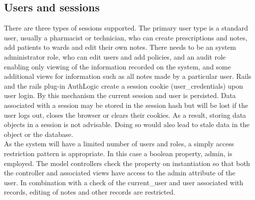 \documentclass[letterpaper]{amsart}
\begin{document}
\subsection{Users and sessions} 
There are three types of sessions supported.  The primary user type is a standard user, usually a pharmacist or technician, who can create prescriptions and notes, add patients to wards and edit their own notes.  There needs to be an system administrator role, who can edit users and add policies, and an audit role enabling only viewing of the information recorded on the system, and some additional views for information such as all notes made by a particular user.
Rails and the rails plug-in AuthLogic create a session cookie (user\_credentials) upon user login.  By this mechanism the current session and user is persisted.  Data associated with a session may be stored in the session hash but will be lost if the user logs out, closes the browser or clears their cookies.  As a result, storing data objects in a session is not advisable.  Doing so would also lead to stale data in the object or the database.\\
As the system will have a limited number of users and roles, a simply access restriction pattern is appropriate.  In this case a boolean property, admin, is employed.  The model controllers check the property on instantiation so that both the controller and associated views have access to the admin attribute of the user.  In combination with a check of the current\_user and user associated with records, editing of notes and other records are restricted.
\end{document}
